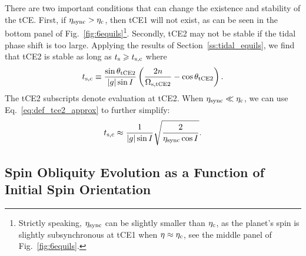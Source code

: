 \documentclass[
        fleqn,
        usenatbib,
    ]{mnras}
\newcommand*{\abs}[1]{\left|#1\right|}
\newcommand*{\p}[1]{\left(#1\right)}
\begin{document}
There are two important conditions that can change the existence and stability
of the tCE\@. First, if $\eta_{\rm sync} > \eta_{\rm c}$, then tCE1 will not
exist, as can be seen in the bottom panel of
Fig.~\ref{fig:6equils}\footnote{Strictly speaking, $\eta_{\rm sync}$ can be
slightly smaller than $\eta_{\rm c}$, as the planet's spin is slightly
subsynchronous at tCE1 when $\eta \approx \eta_{\rm c}$, see the middle panel of
Fig.~\ref{fig:6equils}.}. Secondly, tCE2 may not be stable if the tidal phase
shift is too large. Applying the results of Section~\ref{ss:tidal_equils}, we
find that tCE2 is stable as long as $t_{\rm s} \geq t_{\rm s, c}$ where
\begin{equation}
    t_{\rm s, c} \equiv \frac{\sin \theta_{\rm tCE2}}{\abs{g} \sin
            I}\p{\frac{2n}{\Omega_{\rm s, tCE2}} - \cos \theta_{\rm tCE2}}.
\end{equation}
The tCE2 subscripts denote evaluation at tCE2. When $\eta_{\rm sync} \ll
\eta_{\rm c}$, we can use Eq.~\eqref{eq:def_tce2_approx} to further simplify:
\begin{equation}
    t_{\rm s, c}\approx \frac{1}{\abs{g}\sin I}\sqrt{\frac{2}{\eta_{\rm sync}
        \cos I}}. \label{eq:def_ts_crit}
\end{equation}

\subsection{Spin Obliquity Evolution as a Function of Initial Spin Orientation}
\end{document}
